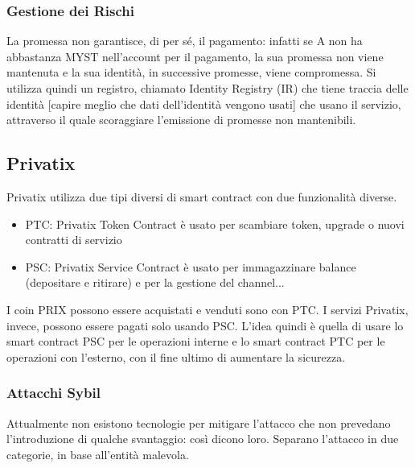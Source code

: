 \documentclass[]{article}
\begin{document}
	\subsubsection{Gestione dei Rischi}	
	La promessa non garantisce, di per sé, il pagamento: infatti se A non ha abbastanza MYST nell'account per il pagamento, la sua promessa non viene mantenuta e la sua identità, in successive promesse, viene compromessa.
	Si utilizza quindi un registro, chiamato Identity Registry (IR) che tiene traccia delle identità [capire meglio che dati dell’identità vengono usati] che usano il servizio, attraverso il quale scoraggiare l’emissione di promesse non mantenibili.
	
	
	
	\subsection{Privatix}	
	Privatix utilizza due tipi diversi di smart contract con due funzionalità diverse.	
	\begin{itemize}
	\item PTC: Privatix Token Contract è usato per scambiare token, upgrade o nuovi contratti di servizio
	\item PSC: Privatix Service Contract è usato per immagazzinare balance (depositare e ritirare) e per la gestione del channel...
	\end{itemize}	
	I coin PRIX possono essere acquistati e venduti sono con PTC. I servizi Privatix, invece, possono essere pagati solo usando PSC.
	L’idea quindi è quella di usare lo smart contract PSC per le operazioni interne e lo smart contract PTC per le operazioni con l’esterno, con il fine ultimo di aumentare la sicurezza.	
	\subsubsection{Attacchi Sybil}	
	Attualmente non esistono tecnologie per mitigare l’attacco che non prevedano l’introduzione di qualche svantaggio: così dicono loro.
	Separano l’attacco in due categorie, in base all’entità malevola.	
\end{document}

